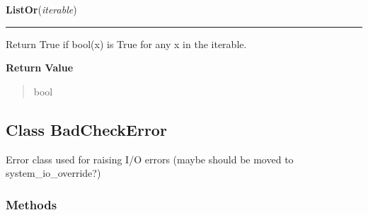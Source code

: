     \vspace{0.5ex}

\hspace{.8\funcindent}\begin{boxedminipage}{\funcwidth}

    \raggedright \textbf{ListOr}(\textit{iterable})

    \vspace{-1.5ex}

    \rule{\textwidth}{0.5\fboxrule}
\setlength{\parskip}{2ex}
    Return True if bool(x) is True for any x in the iterable.

\setlength{\parskip}{1ex}
      \textbf{Return Value}
    \vspace{-1ex}

      \begin{quote}
      bool

      \end{quote}

    \end{boxedminipage}



\subsection{Class BadCheckError}

    \label{System:Utils:BadCheckError}
Error class used for raising I/O errors (maybe should be moved to 
system\_io\_override?)



  \subsubsection{Methods}

    \label{System:Utils:BadCheckError:__init__}

